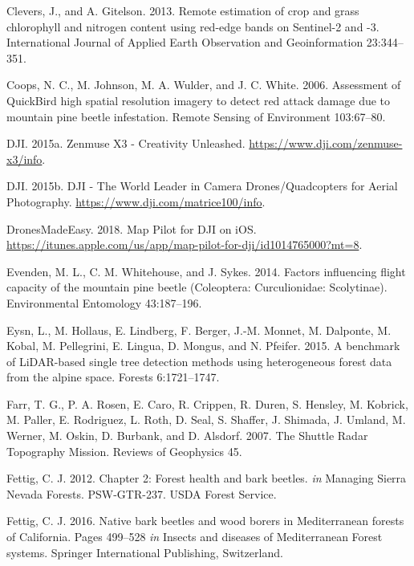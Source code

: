 \documentclass[]{article}
\begin{document}
\leavevmode\hypertarget{ref-clevers2013}{}%
Clevers, J., and A. Gitelson. 2013. Remote estimation of crop and grass
chlorophyll and nitrogen content using red-edge bands on Sentinel-2 and
-3. International Journal of Applied Earth Observation and
Geoinformation 23:344--351.

\leavevmode\hypertarget{ref-coops2006}{}%
Coops, N. C., M. Johnson, M. A. Wulder, and J. C. White. 2006.
Assessment of QuickBird high spatial resolution imagery to detect red
attack damage due to mountain pine beetle infestation. Remote Sensing of
Environment 103:67--80.

\leavevmode\hypertarget{ref-dji2015}{}%
DJI. 2015a. Zenmuse X3 - Creativity Unleashed.
\url{https://www.dji.com/zenmuse-x3/info}.

\leavevmode\hypertarget{ref-dji2015a}{}%
DJI. 2015b. DJI - The World Leader in Camera Drones/Quadcopters for
Aerial Photography. \url{https://www.dji.com/matrice100/info}.

\leavevmode\hypertarget{ref-dronesmadeeasy2018}{}%
DronesMadeEasy. 2018. ‎Map Pilot for DJI on iOS.
\url{https://itunes.apple.com/us/app/map-pilot-for-dji/id1014765000?mt=8}.

\leavevmode\hypertarget{ref-evenden2014}{}%
Evenden, M. L., C. M. Whitehouse, and J. Sykes. 2014. Factors
influencing flight capacity of the mountain pine beetle (Coleoptera:
Curculionidae: Scolytinae). Environmental Entomology 43:187--196.

\leavevmode\hypertarget{ref-eysn2015}{}%
Eysn, L., M. Hollaus, E. Lindberg, F. Berger, J.-M. Monnet, M. Dalponte,
M. Kobal, M. Pellegrini, E. Lingua, D. Mongus, and N. Pfeifer. 2015. A
benchmark of LiDAR-based single tree detection methods using
heterogeneous forest data from the alpine space. Forests 6:1721--1747.

\leavevmode\hypertarget{ref-farr2007}{}%
Farr, T. G., P. A. Rosen, E. Caro, R. Crippen, R. Duren, S. Hensley, M.
Kobrick, M. Paller, E. Rodriguez, L. Roth, D. Seal, S. Shaffer, J.
Shimada, J. Umland, M. Werner, M. Oskin, D. Burbank, and D. Alsdorf.
2007. The Shuttle Radar Topography Mission. Reviews of Geophysics 45.

\leavevmode\hypertarget{ref-fettig2012b}{}%
Fettig, C. J. 2012. Chapter 2: Forest health and bark beetles. \emph{in}
Managing Sierra Nevada Forests. PSW-GTR-237. USDA Forest Service.

\leavevmode\hypertarget{ref-fettig2016}{}%
Fettig, C. J. 2016. Native bark beetles and wood borers in Mediterranean
forests of California. Pages 499--528 \emph{in} Insects and diseases of
Mediterranean Forest systems. Springer International Publishing,
Switzerland.
\end{document}
